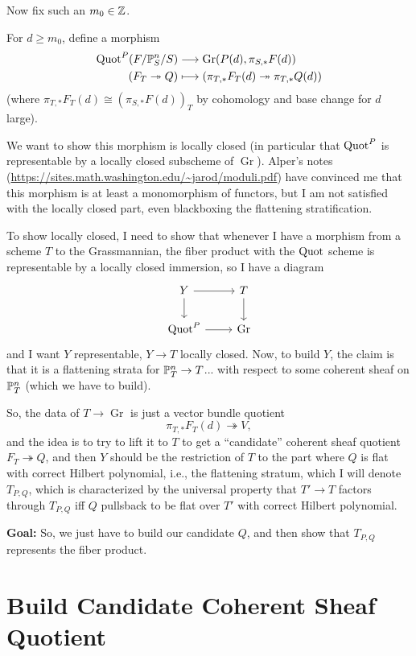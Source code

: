 \documentclass[12pt]{article}
\DeclareMathOperator{\Gr}{Gr}
\begin{document}
Now fix such an $m_0\in \Z$.

For $d\geq m_0$, define a morphism
\begin{align*}
    \Quot^P(F/\P^n_S/S) &\longrightarrow \Gr(P(d),\pi_{S,*}F(d))\\
    (F_T \twoheadrightarrow Q) &\longmapsto (\pi_{T,*} F_T(d) \twoheadrightarrow \pi_{T,*} Q(d))
\end{align*}
(where $\pi_{T,*} F_T(d) \cong (\pi_{S,*} F(d))_T$ by cohomology and base change for $d$ large).

We want to show this morphism is locally closed (in particular that $\Quot^P$ is representable by a locally closed subscheme of $\Gr$). Alper's notes (\url{https://sites.math.washington.edu/~jarod/moduli.pdf}) have convinced me that this morphism is at least a monomorphism of functors, but I am not satisfied with the locally closed part, even blackboxing the flattening stratification.

To show locally closed, I need to show that whenever I have a morphism from a scheme $T$ to the Grassmannian, the fiber product with the $\Quot$ scheme is representable by a locally closed immersion, so I have a diagram
\[\begin{tikzcd}
    Y \rar\dar & T \dar\\
    \Quot^P \rar & \Gr
\end{tikzcd}\]
and I want $Y$ representable, $Y\to T$ locally closed. Now, to build $Y$, the claim is that it is a flattening strata for $\P^n_T \to T$... with respect to some coherent sheaf on $\P_T^n$ (which we have to build).

So, the data of $T\to \Gr$ is just a vector bundle quotient
\[\pi_{T,*} F_T(d) \twoheadrightarrow V,\]
and the idea is to try to lift it to $T$ to get a ``candidate'' coherent sheaf quotient $F_T\twoheadrightarrow Q$, and then $Y$ should be the restriction of $T$ to the part where $Q$ is flat with correct Hilbert polynomial, i.e., the flattening stratum, which I will denote $T_{P,Q}$, which is characterized by the universal property that $T'\to T$ factors through $T_{P,Q}$ iff $Q$ pullsback to be flat over $T'$ with correct Hilbert polynomial.

\textbf{Goal:} So, we just have to build our candidate $Q$, and then show that $T_{P,Q}$ represents the fiber product.



\section{Build Candidate Coherent Sheaf Quotient}
\end{document}

